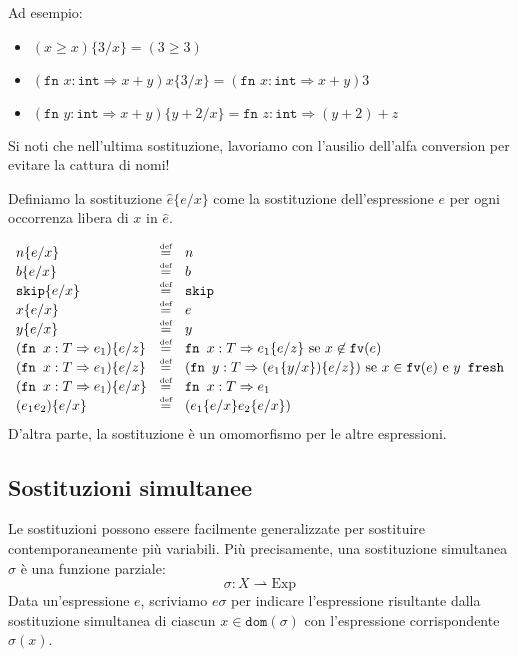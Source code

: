 Ad esempio:
\begin{itemize}
    \item $(x \geq x)\{3/x\} = (3 \geq 3)$
    \item $(\texttt{fn } x:\texttt{int} \Rightarrow x+y)x\{3/x\} = 
    (\texttt{fn } x:\texttt{int} \Rightarrow x+y)3$
    \item $(\texttt{fn } y:\texttt{int} \Rightarrow x+y)\{y+2/x\} = 
    \texttt{fn } z:\texttt{int} \Rightarrow (y+2)+z$
\end{itemize}

Si noti che nell'ultima sostituzione, lavoriamo con l'ausilio dell'alfa conversion
per evitare la cattura di nomi!

Definiamo la sostituzione $\hat{e}\{e/x\}$ come la sostituzione dell'espressione
$e$ per ogni occorrenza libera di $x$ in $\hat{e}$. 

\[
\begin{array}{lcl}
    n\{e/x\} & \defeq & n \\
    b\{e/x\} & \defeq & b \\
    \texttt{skip}\{e/x\} & \defeq & \texttt{skip} \\
    x\{e/x\} & \defeq & e \\
    y\{e/x\} & \defeq & y \\
    (\texttt{fn } x:T\Rightarrow e_1)\{e/z\} & \defeq & \texttt{fn } x:T\Rightarrow e_1\{e/z\} \text{ se } x \not\in \texttt{fv}(e) \\
    (\texttt{fn } x:T\Rightarrow e_1)\{e/z\} & \defeq & (\texttt{fn } y:T\Rightarrow (e_1\{y/x\})\{e/z\}) \text{ se }
    x \in \texttt{fv}(e) \text{ e } y \texttt{ fresh} \\
    (\texttt{fn } x:T\Rightarrow e_1)\{e/x\} & \defeq & \texttt{fn } x:T\Rightarrow e_1 \\
    (e_1e_2)\{e/x\} & \defeq & (e_1\{e/x\}e_2\{e/x\}) \\
\end{array}
\]
D'altra parte, la sostituzione è un omomorfismo per le altre espressioni.
\subsection{Sostituzioni simultanee}
Le sostituzioni possono essere facilmente generalizzate per sostituire
contemporaneamente più variabili. Più precisamente, una sostituzione
simultanea $\sigma$ è una funzione parziale:
\[\sigma: X \rightharpoonup \text{Exp}\]
Data un'espressione $e$, scriviamo $e\sigma$ per indicare l'espressione
risultante dalla sostituzione simultanea di ciascun $x \in \texttt{dom}(\sigma)$
con l'espressione corrispondente $\sigma(x)$. 

